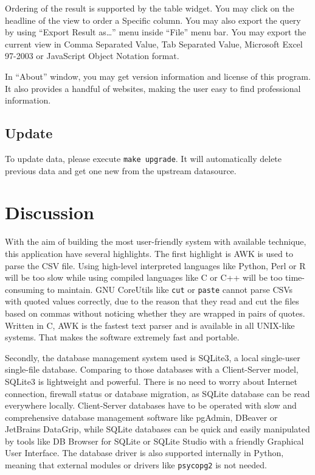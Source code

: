 \documentclass[]{ylarticle}
\begin{document}
Ordering of the result is supported by the table widget. You may click on the headline of the view to order a Specific column. You may also export the query by using ``Export Result as\ldots'' menu inside ``File'' menu bar. You may export the current view in Comma Separated Value, Tab Separated Value, Microsoft Excel 97-2003 or JavaScript Object Notation format.

In ``About'' window, you may get version information and license of this program. It also provides a handful of websites, making the user easy to find professional information.

\subsection{Update}
To update data, please execute \verb|make upgrade|. It will automatically delete previous data and get one new from the upstream datasource.

\section{Discussion}
With the aim of building the most user-friendly system with available technique, this application have several highlights. The first highlight is AWK is used to parse the CSV file. Using high-level interpreted languages like Python, Perl or R will be too slow while using compiled languages like C or C++ will be too time-consuming to maintain. GNU CoreUtils like \verb|cut| or \verb|paste| cannot parse CSVs with quoted values correctly, due to the reason that they read and cut the files based on commas without noticing whether they are wrapped in pairs of quotes. Written in C, AWK is the fastest text parser and is available in all UNIX-like systems. That makes the software extremely fast and portable.

Secondly, the database management system used is SQLite3, a local single-user single-file database. Comparing to those databases with a Client-Server model, SQLite3 is lightweight and powerful. There is no need to worry about Internet connection, firewall status or database migration, as SQLite database can be read everywhere locally. Client-Server databases have to be operated with slow and comprehensive database management software like pgAdmin, DBeaver or JetBrains DataGrip, while SQLite databases can be quick and easily manipulated by tools like DB Browser for SQLite or SQLite Studio with a friendly Graphical User Interface. The database driver is also supported internally in Python, meaning that external modules or drivers like \verb|psycopg2| is not needed.
\end{document}
